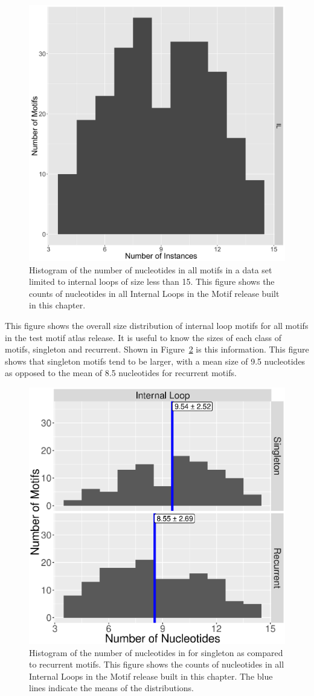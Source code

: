 \begin{figure}
  \includegraphics[width=0.5\linewidth]{chapter-5/figs/motifs/nucleotides}
  \caption{Histogram of the number of nucleotides in all motifs in a data set
  limited to internal loops of size less than 15. This figure shows the counts
  of nucleotides in all Internal Loops in the Motif release built in this
  chapter.}
\label{fig:num-motif-nucleotides}
\end{figure}

This figure shows the overall size distribution of internal loop motifs for all
motifs in the test motif atlas release. It is useful to know the sizes of each
class of motifs, singleton and recurrent. Shown in
Figure~\ref{fig:num-nt-by-class} is this information. This figure shows that
singleton motifs tend to be larger, with a mean size of 9.5 nucleotides as
opposed to the mean of 8.5 nucleotides for recurrent motifs.


\begin{figure}
  \includegraphics[width=0.5\linewidth]{chapter-5/figs/motifs/nucleotides-by-type}
  \caption{Histogram of the number of nucleotides in for singleton as compared
  to recurrent motifs. This figure shows the counts of nucleotides in all
  Internal Loops in the Motif release built in this chapter. The blue lines
  indicate the means of the distributions.}
\label{fig:num-nt-by-class}
\end{figure}

